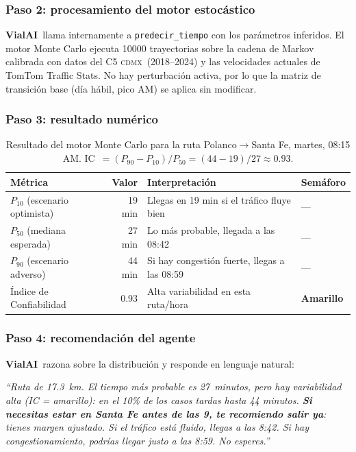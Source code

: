 \documentclass[11pt,a4paper]{article}
\newcommand{\VialAI}{\textbf{\textcolor{vialTeal}{Vial}\textcolor{vialAmber}{AI}}}
\newcommand{\CDMX}{\textsc{cdmx}}
\begin{document}
\subsubsection{Paso 2: procesamiento del motor estocástico}

\VialAI\ llama internamente a \texttt{predecir\_tiempo} con los
parámetros inferidos. El motor Monte Carlo ejecuta \num{10000}
trayectorias sobre la cadena de Markov calibrada con datos del C5
\CDMX\ (2018--2024) y las velocidades actuales de TomTom Traffic
Stats. No hay perturbación activa, por lo que la matriz de transición
base (día hábil, pico AM) se aplica sin modificar.

\subsubsection{Paso 3: resultado numérico}

\begin{table}[H]
\centering
\small
\renewcommand{\arraystretch}{1.4}
\begin{tabular}{@{}lrll@{}}
\toprule
\rowcolor{vialNavy!10}
\textbf{Métrica} & \textbf{Valor} & \textbf{Interpretación} & \textbf{Semáforo} \\
\midrule
$P_{10}$ (escenario optimista) & 19 min & Llegas en 19 min si el tráfico fluye bien & --- \\
$P_{50}$ (mediana esperada)    & 27 min & Lo más probable, llegada a las 08:42 & --- \\
$P_{90}$ (escenario adverso)   & 44 min & Si hay congestión fuerte, llegas a las 08:59 & --- \\
\midrule
\rowcolor{vialAmber!15}
Índice de Confiabilidad        & 0.93 & Alta variabilidad en esta ruta/hora & \textbf{Amarillo} \\
\bottomrule
\end{tabular}
\caption{Resultado del motor Monte Carlo para la ruta Polanco$\to$Santa Fe,
         martes, 08:15 AM. IC~$= (P_{90} - P_{10}) / P_{50} = (44-19)/27 \approx 0.93$.}
\label{tab:ejemplo_miguel}
\end{table}

\subsubsection{Paso 4: recomendación del agente}

\VialAI\ razona sobre la distribución y responde en lenguaje natural:

\begin{casebox}[Respuesta de \VialAI\ a Miguel]
\itshape
``Ruta de 17.3~km. El tiempo más probable es 27~minutos, pero hay
variabilidad alta (IC = amarillo): en el 10\% de los casos tardas
hasta 44 minutos. \textbf{Si necesitas estar en Santa Fe antes de las
9, te recomiendo salir ya}: tienes margen ajustado. Si el tráfico está
fluido, llegas a las 8:42. Si hay congestionamiento, podrías llegar
justo a las 8:59. No esperes.''
\end{casebox}
\end{document}
